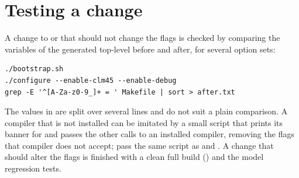 \section{Testing a change}

A change to  or  that should not
change the flags is checked by comparing the variables of the generated
top-level  before and after, for several option sets:

\begin{lstlisting}
./bootstrap.sh
./configure --enable-clm45 --enable-debug
grep -E '^[A-Za-z0-9_]+ = ' Makefile | sort > after.txt
\end{lstlisting}

The values in  are split over several lines and do not
suit a plain comparison. A compiler that is not installed can be imitated
by a small script that prints its banner for  and passes
the other calls to an installed compiler, removing the flags that compiler
does not accept; pass the same script as  and . A
change that should alter the flags is finished with a clean full build
() and the model regression tests.

\fussy
